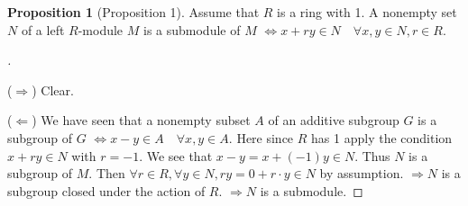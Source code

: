 \documentclass{article}
\theoremstyle{definition}
\newtheorem{prop}{Proposition}
\newenvironment{proofs}[1][\proofname]{%
  \begin{proof}[#1]$ $\par\nobreak\ignorespaces
}{%
  \end{proof}
}
\newcommand{\Ra}{\Rightarrow}
\newcommand{\La}{\Leftarrow}
\newcommand{\Lra}{\Leftrightarrow}
\begin{document}
\begin{prop}[Proposition 1]
	Assume that $R$ is a ring with 1.
	A nonempty set $N$ of a left $R$-module $M$ is a submodule of $M$ $\Lra x + ry \in N \quad \forall x, y \in N, r \in R$.
\end{prop}

\begin{proofs}
	($\Ra$) Clear.

	\par ($\La$) We have seen that a nonempty subset $A$ of an additive subgroup $G$ is a subgroup of $G$ $\Lra x - y \in A \quad \forall x, y \in A$.
	Here since $R$ has 1 apply the condition $x + ry \in N$ with $r = -1$.
	We see that $x - y = x + (-1) y \in N$.
	Thus $N$ is a subgroup of $M$.
	Then $\forall r \in R, \forall y \in N, ry = 0 + r \cdot y \in N$ by assumption.
	$\Ra N$ is a subgroup closed under the action of $R$.
	$\Ra N$ is a submodule.
\end{proofs}
\end{document}
